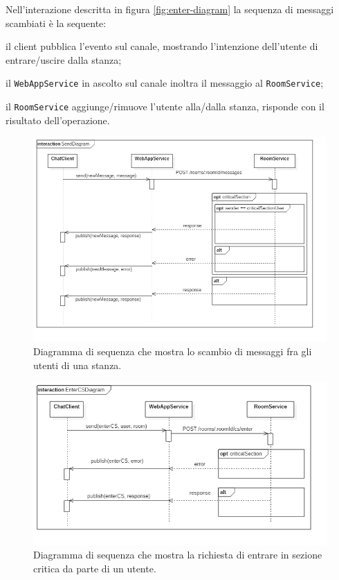 \documentclass[a4paper]{article}
\begin{document}
Nell'interazione descritta in figura \ref{fig:enter-diagram} la sequenza di messaggi scambiati è la sequente:
\begin{enumerate*}[label=(\arabic*)]
%
    \item il client pubblica l'evento sul canale, mostrando l'intenzione dell'utente di entrare/uscire dalla stanza;
%
    \item il \texttt{WebAppService} in ascolto sul canale inoltra il messaggio al \texttt{RoomService};
%   
    \item il \texttt{RoomService} aggiunge/rimuove l'utente alla/dalla stanza, risponde con il risultato dell'operazione.
%
\end{enumerate*}

\begin{figure}[H]
    \centering
    \includegraphics[width=\linewidth, height=\textheight, keepaspectratio]{res/SendDiagram.png}
        \caption{Diagramma di sequenza che mostra lo scambio di messaggi fra gli utenti di una stanza.}
    \label{fig:messages-diagram}
\end{figure}

\begin{figure}[H]
    \centering
    \includegraphics[width=\linewidth, height=\textheight, keepaspectratio]{res/EnterCSDiagram.png}
        \caption{Diagramma di sequenza che mostra la richiesta di entrare in sezione critica da parte di un utente.}
    \label{fig:enterCS-diagram}
\end{figure}
\end{document}
